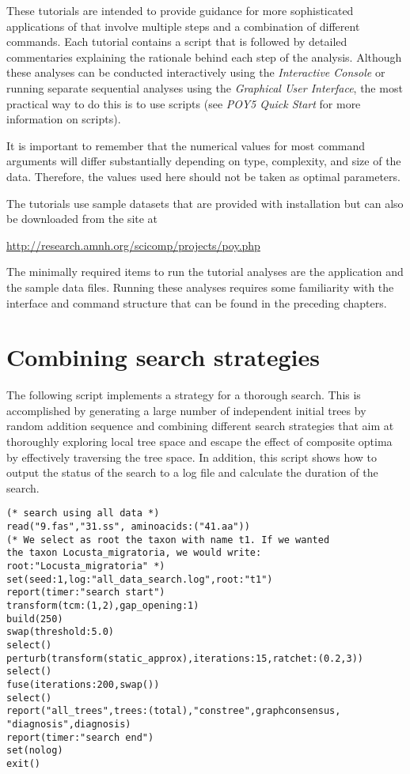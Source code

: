 These tutorials are intended to provide guidance for more sophisticated applications of \poy that involve 
multiple steps and a combination of different commands. Each tutorial contains a \poy script that is followed 
by detailed commentaries explaining the rationale behind each step of the analysis. Although these analyses 
can be conducted interactively using the \emph{Interactive Console} or running separate sequential analyses
 using the \emph{Graphical User Interface}, the most practical way to do this is to use \poy scripts (see 
 \emph{ POY5 Quick Start} for more information on \poy scripts).

It is important to remember that the numerical values for most command arguments will differ substantially 
depending on type, complexity, and size of the data. Therefore, the values used here should not be taken as 
optimal parameters.

The tutorials use sample datasets that are provided with \poy installation but can also be downloaded from 
the \poy site at
\begin{center}
\url{http://research.amnh.org/scicomp/projects/poy.php}
\end{center}
The minimally required items to run the tutorial analyses are the \poy application and the sample data files. 
Running these analyses requires some familiarity with the \poy interface and command structure that can be 
found in the preceding chapters.

\section{Combining  search strategies}{\label{tutorial1}}
The following script implements a strategy for a thorough search. This is accomplished by generating a large 
number of independent initial trees by random addition sequence and combining different search strategies 
that aim at thoroughly exploring local tree space and escape the effect of composite optima by effectively 
traversing the tree space. In addition, this script shows how to output the status of the search to a log file and
 calculate the duration of the search. 

\begin{verbatim}
(* search using all data *)
read("9.fas","31.ss", aminoacids:("41.aa"))
(* We select as root the taxon with name t1. If we wanted
the taxon Locusta_migratoria, we would write:
root:"Locusta_migratoria" *)
set(seed:1,log:"all_data_search.log",root:"t1")
report(timer:"search start")
transform(tcm:(1,2),gap_opening:1)
build(250)
swap(threshold:5.0)
select()
perturb(transform(static_approx),iterations:15,ratchet:(0.2,3))
select()
fuse(iterations:200,swap())
select()
report("all_trees",trees:(total),"constree",graphconsensus,
"diagnosis",diagnosis)
report(timer:"search end")
set(nolog)
exit()
\end{verbatim}

